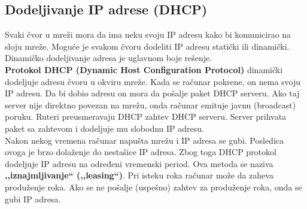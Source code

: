 \documentclass[a4paper]{article}
\begin{document}
    \subsection{Dodeljivanje IP adrese (DHCP)}
        Svaki čvor u mreži mora da ima neku svoju IP adresu kako bi komunicirao na sloju mreže.
        Moguće je svakom čvoru dodeliti IP adresu statički ili dinamički. Dinamičko dodeljivanje adresa
        je uglavnom boje rešenje.\\
        \indent \textbf{Protokol DHCP (Dynamic Host Configuration Protocol)} dinamički dodeljuje adresu čvoru 
        u okviru mreže. Kada se računar pokrene, on nema svoju IP adresu.
        Da bi dobio adresu on mora da pošalje paket DHCP serveru. Ako taj server nije direktno
        povezan na mrežu, onda računar emituje javnu (broadcast) poruku. Ruteri preusmeravaju
        DHCP zahtev DHCP serveru. Server prihvata paket sa zahtevom i dodeljuje mu slobodnu
        IP adresu. \\
        \indent Nakon nekog vremena računar napušta mrežu i IP adresa se gubi. Posledica ovoga
        je brzo dolaženje do nestašice IP adresa. Zbog toga DHCP protokol dodeljuje IP
        adresu na određeni vremenski period. Ova metoda se naziva \textbf{,,iznajmljivanje`` 
        (,,leasing``)}. Pri isteku roka računar može da zaheva produženje roka. Ako se ne pošalje 
        (uspešno) zahtev za produženje roka, onda se gubi IP adresa. \\
\end{document}
